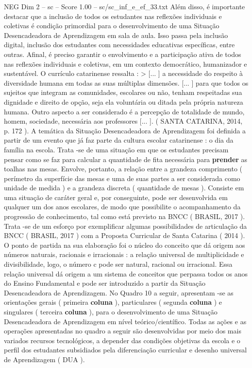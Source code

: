 \begin{textsample}{NEG Dim 2 – sc – Score 1.00 – sc/sc\_inf\_e\_ef\_33.txt}
Além disso, é importante destacar que a inclusão de todos os estudantes nas reflexões individuais e coletivas é condição primordial para o desenvolvimento de uma Situação Desencadeadora de Aprendizagem em sala de aula.
Isso passa pela inclusão digital, inclusão dos estudantes com necessidades educativas específicas, entre outras.
Afinal, é preciso garantir o envolvimento e a participação ativa de todos nas reflexões individuais e coletivas, em um contexto democrático, humanizador e sustentável.
O currículo catarinense ressalta : > [... ] a necessidade do respeito à diversidade humana em todas as suas múltiplas dimensões. [... ] para que todos os sujeitos que integram as comunidades, escolares ou não, tenham respeitadas sua dignidade e direito de opção, seja ela voluntária ou ditada pela própria natureza humana.
Outro aspecto a ser considerado é a percepção de totalidade de mundo, homem, sociedade, necessária aos professores [... ]. ( SANTA CATARINA, 2014, p. 172 ).
A temática da Situação Desencadeadora de Aprendizagem foi definida a partir de um evento que já faz parte da cultura escolar catarinense : o dia da família na escola.
Trata -se de uma situação em que os estudantes precisam pensar como se faz para calcular a quantidade de fita necessária para \textbf{prender} as toalhas nas mesas.
Envolve, portanto, a relação entre a grandeza comprimento ( perímetro da superfície das mesas e uma de suas partes a ser considerada como unidade de medida ) e a grandeza discreta ( quantidade de mesas ).
Consiste em uma situação de caráter geral e, por conseguinte, pode ser desenvolvida em qualquer um dos anos escolares, de modo que possibilite o acompanhamento da progressão de conhecimento, tal como está previsto na BNCC ( BRASIL, 2017 ).
Trata -se de um esforço por exemplificar algumas possibilidades de articulação da BNCC ( BRASIL, 2017 ) com a Proposta Curricular de Santa Catarina ( 2014 ).
O ponto de partida na sua elaboração foi o núcleo do conceito que dá origem aos números naturais, racionais e irracionais : a relação universal de multiplicidade e divisibilidade, logo, o número c pode ser natural, racional ou irracional.
Essa relação universal dá origem a um sistema de conceitos que perpassa todos os anos do Ensino Fundamental e pode ser introduzido a partir da Situação Desencadeadora de Aprendizagem.
No Quadro 10 a seguir, apresentam -se as orientações gerais ( primeira \textbf{coluna} ), particulares ( segunda \textbf{coluna} ) e singulares ( terceira \textbf{coluna} ), para o desenvolvimento de uma Situação Desencadeadora de Aprendizagem em nível teórico/científico.
Todas as ações e as operações apresentadas no quadro a seguir são desenvolvidas por meio dos mais variados recursos tecnológicos, a depender das condições objetivas da escola e o perfil dos estudantes subsidiados pela diferenciação curricular e desenho universal de Aprendizagem ( DUA ).

\end{textsample}
